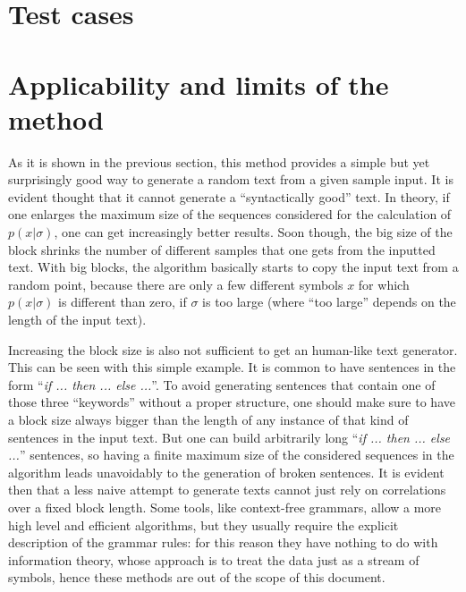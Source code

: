 \documentclass[11pt]{article} %
\begin{document}
\section{Test cases}

\section{Applicability and limits of the method}

As it is shown in the previous section, this method provides a simple but yet surprisingly good way to generate a random text from a given sample input. It is evident thought that it cannot generate a ``syntactically good'' text. In theory, if one enlarges the maximum size of the sequences considered for the calculation of $p(x|\sigma)$, one can get increasingly better results. Soon though, the big size of the block shrinks the number of different samples that one gets from the inputted text. With big blocks, the algorithm basically starts to copy the input text from a random point, because there are only a few different symbols $x$ for which $p(x|\sigma)$ is different than zero, if $\sigma$ is too large (where ``too large'' depends on the length of the input text).

Increasing the block size is also not sufficient to get an human-like text generator. This can be seen with this simple example. It is common to have sentences in the form ``\emph{if ... then ... else ...}''. To avoid generating sentences that contain one of those three ``keywords'' without a proper structure, one should make sure to have a block size always bigger than the length of any instance of that kind of sentences in the input text. But one can build arbitrarily long ``\emph{if ... then ... else ...}'' sentences, so having a finite maximum size of the considered sequences in the algorithm leads unavoidably to the generation of broken sentences. It is evident then that a less naive attempt to generate texts cannot just rely on correlations over a fixed block length. Some tools, like context-free grammars, allow a more high level and efficient algorithms, but they usually require the explicit description of the grammar rules: for this reason they have nothing to do with information theory, whose approach is to treat the data just as a stream of symbols, hence these methods are out of the scope of this document.
\end{document}
